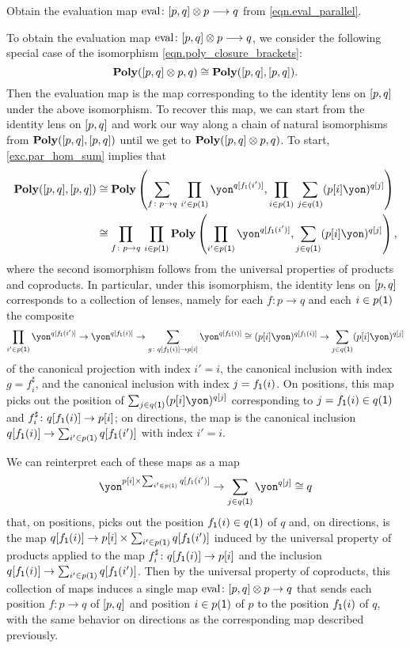 \documentclass[Book-Poly]{subfiles}
\begin{document}
\begin{exercise} \label{exc.eval_parallel}
Obtain the evaluation map $\mathrm{eval}\colon [p,q]\otimes p\longrightarrow q$ from \eqref{eqn.eval_parallel}.
\begin{solution}
To obtain the evaluation map $\mathrm{eval}\colon [p,q]\otimes p\longrightarrow q$, we consider the following special case of the isomorphism \eqref{eqn.poly_closure_brackets}:
\[
    \mathbf{Poly}([p,q] \otimes p, q) \cong \mathbf{Poly}([p,q], [p,q]).
\]
Then the evaluation map is the map corresponding to the identity lens on $[p,q]$ under the above isomorphism.
To recover this map, we can start from the identity lens on $[p,q]$ and work our way along a chain of natural isomorphisms from $\mathbf{Poly}([p,q], [p,q])$ until we get to $\mathbf{Poly}([p,q] \otimes p, q)$.
To start, \cref{exc.par_hom_sum} implies that
\begin{align*}
    \poly(\ihom{p,q}, \ihom{p,q})
    &\iso
    \poly\left(\sum_{f \colon p \to q} \, \prod_{i' \in p(\1)} \yon^{q[f_\1(i')]}, \prod_{i \in p(\1)} \, \sum_{j \in q(\1)} (p[i]\yon)^{q[j]}\right) \\
    &\iso
    \prod_{f \colon p \to q} \, \prod_{i \in p(\1)} \poly\left(\prod_{i' \in p(\1)} \yon^{q[f_\1(i')]}, \sum_{j \in q(\1)} (p[i]\yon)^{q[j]}\right),
\end{align*}
where the second isomorphism follows from the universal properties of products and coproducts.
In particular, under this isomorphism, the identity lens on $[p,q]$ corresponds to a collection of lenses, namely for each $f \colon p \to q$ and each $i \in p(\textsf{1})$ the composite
\[
    \prod_{i' \in p(\1)} \yon^{q[f_\1(i')]} \to \yon^{q[f_\1(i)]} \to \sum_{g \colon q[f_\1(i)] \to p[i]} \yon^{q[f_\1(i)]} \iso (p[i]\yon)^{q[f_\1(i)]} \to \sum_{j \in q(\1)} (p[i]\yon)^{q[j]}
\]
of the canonical projection with index $i' = i$, the canonical inclusion with index $g = f^\sharp_i$, and the canonical inclusion with index $j = f_{\textsf{1}}(i)$.
On positions, this map picks out the position of $\sum_{j \in q(\1)} (p[i]\yon)^{q[j]}$ corresponding to $j = f_{\textsf{1}}(i) \in q(\textsf{1})$ and $f^\sharp_i \colon q[f_{\textsf{1}}(i)] \to p[i]$; on directions, the map is the canonical inclusion $q[f_{\textsf{1}}(i)] \to \sum_{i' \in p(\textsf{1})} q[f_{\textsf{1}}(i')]$ with index $i' = i$.

We can reinterpret each of these maps as a map
\[
    \yon^{p[i] \times \sum_{i' \in p(\1)} q[f_\1(i')]} \to \sum_{j \in q(\1)} \yon^{q[j]} \iso q
\]
that, on positions, picks out the position $f_{\textsf{1}}(i) \in q(\textsf{1})$ of $q$ and, on directions, is the map $q[f_{\textsf{1}}(i)] \to p[i] \times \sum_{i' \in p(\textsf{1})} q[f_{\textsf{1}}(i')]$ induced by the universal property of products applied to the map $f^\sharp_i \colon q[f_{\textsf{1}}(i)] \to p[i]$ and the inclusion $q[f_{\textsf{1}}(i)] \to \sum_{i' \in p(\textsf{1})} q[f_{\textsf{1}}(i')]$.
Then by the universal property of coproducts, this collection of maps induces a single map $\mathrm{eval} \colon [p, q] \otimes p \to q$ that sends each position $f \colon p \to q$ of $[p,q]$ and position $i \in p(\textsf{1})$ of $p$ to the position $f_{\textsf{1}}(i)$ of $q$, with the same behavior on directions as the corresponding map described previously.
\end{solution}
\end{exercise}
\end{document}
